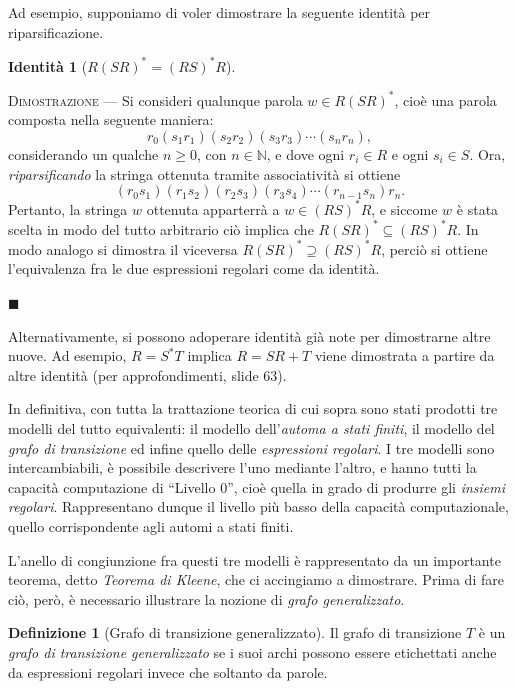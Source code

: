 \documentclass[10pt]{\classname}
\theoremstyle{newlinethm}
\theoremstyle{theorem}
\theoremstyle{definition}
\newtheorem{definizione}{Definizione}[section]
\theoremstyle{definition}
\theoremstyle{definition}
\newtheorem{identita}{Identità}[section]
\theoremstyle{definition}
\begin{document}
\clearpage

Ad esempio, supponiamo di voler dimostrare la seguente identità per riparsificazione.

\begin{identita}[$R(SR)^* = (RS)^* R$]
\end{identita}

\textsc{Dimostrazione } --- Si consideri qualunque parola $w \in R(SR)^*$, cioè
una parola composta nella seguente maniera:
$$r_0(s_1r_1)(s_2r_2)(s_3r_3)\cdots(s_nr_n),$$ considerando un qualche $n \geq
0$, con $n \in \mathbb{N}$, e dove ogni $r_i \in R$ e ogni $s_i \in S$. Ora,
\emph{riparsificando} la stringa ottenuta tramite associatività si ottiene
$$(r_0s_1)(r_1s_2)(r_2s_3)(r_3s_4)\cdots(r_{n-1}s_n)r_n.$$ Pertanto, la stringa
$w$ ottenuta apparterrà a $w \in (RS)^*R$, e siccome $w$ è stata scelta in modo
del tutto arbitrario ciò implica che $R(SR)^* \subseteq (RS)^* R$. In modo
analogo si dimostra il viceversa $R(SR)^* \supseteq (RS)^* R$, perciò si
ottiene l'equivalenza fra le due espressioni regolari come da identità.

\begin{flushright}
$\blacksquare$
\end{flushright}

Alternativamente, si possono adoperare identità già note per dimostrarne altre
nuove. Ad esempio, $R = S^* T$ implica $R = SR + T$ viene dimostrata a partire
da altre identità (per approfondimenti, slide 63).

In definitiva, con tutta la trattazione teorica di cui sopra sono stati
prodotti tre modelli del tutto equivalenti: il modello dell'\emph{automa a
stati finiti}, il modello del \emph{grafo di transizione} ed infine quello
delle \emph{espressioni regolari}. I tre modelli sono intercambiabili, è
possibile descrivere l'uno mediante l'altro, e hanno tutti la capacità
computazione di ``Livello 0'', cioè quella in grado di produrre gli \emph{insiemi
regolari}. Rappresentano dunque il livello più basso della capacità
computazionale, quello corrispondente agli automi a stati finiti.

L'anello di congiunzione fra questi tre modelli è rappresentato da un
importante teorema, detto \emph{Teorema di Kleene}, che ci accingiamo a
dimostrare. Prima di fare ciò, però, è necessario illustrare la nozione di
\emph{grafo generalizzato}.

\begin{definizione}[Grafo di transizione generalizzato]
    Il grafo di transizione $T$ è un \emph{grafo di transizione generalizzato} se i suoi archi possono essere
    etichettati anche da espressioni regolari invece che soltanto da parole.
\end{definizione}
\end{document}
